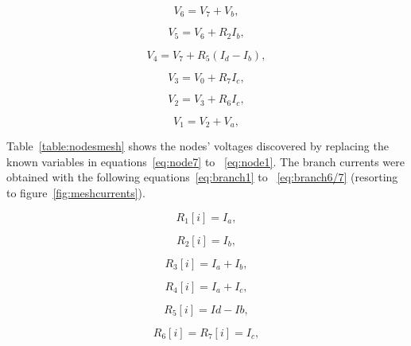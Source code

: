 \begin{equation}
  V_{6} = V_{7} + V_{b},
  \label{eq:node6}
\end{equation}

\begin{equation}
  V_{5} = V_{6} + R_{2}I_{b},
  \label{eq:node5}
\end{equation}

\begin{equation}
  V_{4} = V_{7} + R_{5}(I_{d} - I_{b}),
  \label{eq:node4}
\end{equation}

\begin{equation}
  V_{3} = V_{0} + R_{7}I_{c},
  \label{eq:node3}
\end{equation}

\begin{equation}
  V_{2} = V_{3} + R_{6}I_{c},
  \label{eq:node2}
\end{equation}

\begin{equation}
  V_{1} = V_{2} + V_{a},
  \label{eq:node1}
\end{equation}

Table~\ref{table:nodesmesh} shows the nodes' voltages discovered by replacing the known variables in equations~\ref{eq:node7} to ~\ref{eq:node1}. The branch currents were obtained with the following equations~\ref{eq:branch1} to ~\ref{eq:branch6/7} (resorting to figure~\ref{fig:meshcurrents}).

\begin{equation}
  R_1[i] = I_a,
  \label{eq:branch1}
\end{equation}

\begin{equation}
  R_2[i]= I_b,
  \label{eq:branch2}
\end{equation}

\begin{equation}
  R_3[i] = I_a + I_b,
  \label{eq:branch3}
\end{equation}

\begin{equation}
  R_4[i] = I_a + I_c,
  \label{eq:branch4}
\end{equation}

\begin{equation}
  R_5[i] = Id - Ib,
  \label{eq:branch5}
\end{equation}

\begin{equation}
  R_6[i] = R_7[i] = I_c,
  \label{eq:branch6/7}
\end{equation}



